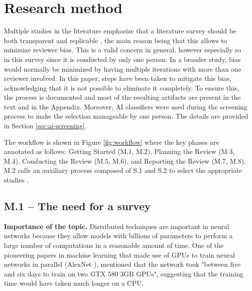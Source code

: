 \section{Research method}
\label{sec:protocol}

Multiple studies in the literature emphasize that a literature survey should be both transparent
and replicable \cite{keele_systematic_2007, dos_santos_sustainable_2024-1}, the main reason being
that this allows to minimize reviewer bias. This is a valid concern in general, however especially
so in this survey since it is conducted by only one person. In a broader study, bias would normally
be minimized by having multiple iterations with more than one reviewer involved. In this paper,
steps have been taken to mitigate this bias, acknowledging that it is not possible to eliminate it
completely. To ensure this, the process is documented and most of the resulting artifacts are
present in the text and in the Appendix. Moreover, AI classifiers were used during the screening
process to make the selection manageable by one person. The details are provided in Section
\ref{sec:ai-screening}.


The workflow is shown in Figure \ref{fig:workflow} where the key phases are annotated as follows:
Getting Started (M.1, M.2), Planning the Review (M.3, M.4), Conducting the Review (M.5, M.6), and
Reporting the Review (M.7, M.8). M.2 calls an auxiliary process composed of S.1 and S.2 to select
the appropriate studies .

\subsection{M.1 -- The need for a survey}
\label{sec:need_for_survey}

\textbf{Importance of the topic.}
Distributed techniques are important in neural networks because they allow models with billions of
parameters to perform a large number of computations in a reasonable amount of time. One of the
pioneering papers in machine learning that made use of GPUs to train neural networks in parallel
(AlexNet \cite{krizhevsky_imagenet_2012}), mentioned that the network took "between five and six days to
train on two GTX 580 3GB GPUs", suggesting that the training time would have taken much longer on a
CPU.

